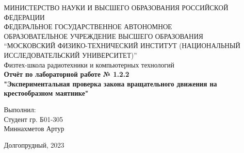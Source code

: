 \begin{center}
МИНИСТЕРСТВО НАУКИ И ВЫСШЕГО ОБРАЗОВАНИЯ РОССИЙСКОЙ ФЕДЕРАЦИИ\\
\hfill \break
ФЕДЕРАЛЬНОЕ ГОСУДАРСТВЕННОЕ АВТОНОМНОЕ \\ ОБРАЗОВАТЕЛЬНОЕ УЧРЕЖДЕНИЕ ВЫСШЕГО ОБРАЗОВАНИЯ \\
“МОСКОВСКИЙ ФИЗИКО-ТЕХНИЧЕСКИЙ ИНСТИТУТ (НАЦИОНАЛЬНЫЙ ИССЛЕДОВАТЕЛЬСКИЙ УНИВЕРСИТЕТ)” \\

\hfill \break
Физтех-школа радиотехники и компьютерных технологий\\
\vspace{2.5cm}
\large{\textbf{Отчёт по лабораторной работе № 1.2.2}}\\
\large{\textbf{"Экспериментальная проверка закона вращательного движения на крестообразном маятнике"}}\\
\hfill \break
\end{center}

\vspace{5cm}

\begin{flushright}
Выполнил:\\
Студент гр. Б01-305\\
Миннахметов Артур\\
\end{flushright}

\vfill


\begin{center} Долгопрудный, 2023 \end{center}

\thispagestyle{empty}
\newpage
